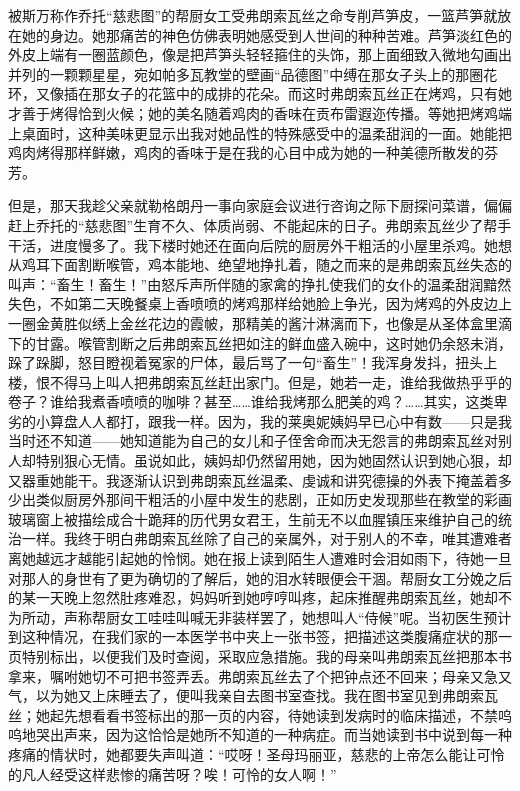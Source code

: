 \par 被斯万称作乔托“慈悲图”的帮厨女工受弗朗索瓦丝之命专削芦笋皮，一篮芦笋就放在她的身边。她那痛苦的神色仿佛表明她感受到人世间的种种苦难。芦笋淡红色的外皮上端有一圈蓝颜色，像是把芦笋头轻轻箍住的头饰，那上面细致入微地勾画出并列的一颗颗星星，宛如帕多瓦教堂的壁画“品德图”中缚在那女子头上的那圈花环，又像插在那女子的花篮中的成排的花朵。而这时弗朗索瓦丝正在烤鸡，只有她才善于烤得恰到火候；她的美名随着鸡肉的香味在贡布雷遐迩传播。等她把烤鸡端上桌面时，这种美味更显示出我对她品性的特殊感受中的温柔甜润的一面。她能把鸡肉烤得那样鲜嫩，鸡肉的香味于是在我的心目中成为她的一种美德所散发的芬芳。
\par 但是，那天我趁父亲就勒格朗丹一事向家庭会议进行咨询之际下厨探问菜谱，偏偏赶上乔托的“慈悲图”生育不久、体质尚弱、不能起床的日子。弗朗索瓦丝少了帮手干活，进度慢多了。我下楼时她还在面向后院的厨房外干粗活的小屋里杀鸡。她想从鸡耳下面割断喉管，鸡本能地、绝望地挣扎着，随之而来的是弗朗索瓦丝失态的叫声：“畜生！畜生！”由怒斥声所伴随的家禽的挣扎使我们的女仆的温柔甜润黯然失色，不如第二天晚餐桌上香喷喷的烤鸡那样给她脸上争光，因为烤鸡的外皮边上一圈金黄胜似绣上金丝花边的霞帔，那精美的酱汁淋漓而下，也像是从圣体盒里滴下的甘露。喉管割断之后弗朗索瓦丝把如注的鲜血盛入碗中，这时她仍余怒未消，跺了跺脚，怒目瞪视着冤家的尸体，最后骂了一句“畜生”！我浑身发抖，扭头上楼，恨不得马上叫人把弗朗索瓦丝赶出家门。但是，她若一走，谁给我做热乎乎的卷子？谁给我煮香喷喷的咖啡？甚至……谁给我烤那么肥美的鸡？……其实，这类卑劣的小算盘人人都打，跟我一样。因为，我的莱奥妮姨妈早已心中有数——只是我当时还不知道——她知道能为自己的女儿和子侄舍命而决无怨言的弗朗索瓦丝对别人却特别狠心无情。虽说如此，姨妈却仍然留用她，因为她固然认识到她心狠，却又器重她能干。我逐渐认识到弗朗索瓦丝温柔、虔诚和讲究德操的外表下掩盖着多少出类似厨房外那间干粗活的小屋中发生的悲剧，正如历史发现那些在教堂的彩画玻璃窗上被描绘成合十跪拜的历代男女君王，生前无不以血腥镇压来维护自己的统治一样。我终于明白弗朗索瓦丝除了自己的亲属外，对于别人的不幸，唯其遭难者离她越远才越能引起她的怜悯。她在报上读到陌生人遭难时会泪如雨下，待她一旦对那人的身世有了更为确切的了解后，她的泪水转眼便会干涸。帮厨女工分娩之后的某一天晚上忽然肚疼难忍，妈妈听到她哼哼叫疼，起床推醒弗朗索瓦丝，她却不为所动，声称帮厨女工哇哇叫喊无非装样罢了，她想叫人“侍候”呢。当初医生预计到这种情况，在我们家的一本医学书中夹上一张书签，把描述这类腹痛症状的那一页特别标出，以便我们及时查阅，采取应急措施。我的母亲叫弗朗索瓦丝把那本书拿来，嘱咐她切不可把书签弄丢。弗朗索瓦丝去了个把钟点还不回来；母亲又急又气，以为她又上床睡去了，便叫我亲自去图书室查找。我在图书室见到弗朗索瓦丝；她起先想看看书签标出的那一页的内容，待她读到发病时的临床描述，不禁呜呜地哭出声来，因为这恰恰是她所不知道的一种病症。而当她读到书中说到每一种疼痛的情状时，她都要失声叫道：“哎呀！圣母玛丽亚，慈悲的上帝怎么能让可怜的凡人经受这样悲惨的痛苦呀？唉！可怜的女人啊！”
